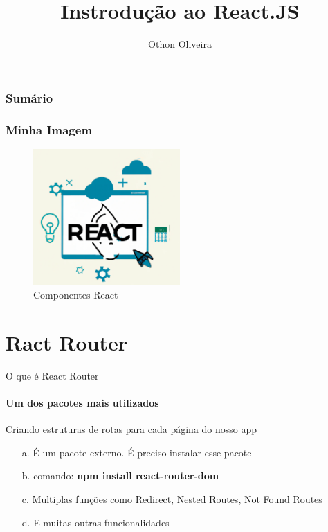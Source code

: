 \documentclass[13pt, xcolor={dvipsnames,svgnames}, portuguese]{beamer}
\author{Othon Oliveira}
\title{Instrodução ao React.JS}
\institute{SENAC - PROA}
\date{}
\begin{document}
\begin{frame}
\titlepage
\end{frame}

\newcommand{\capa}{
    \begin{tikzpicture}[remember picture,overlay]
        \node at (current page.south west)
            {\begin{tikzpicture}[remember picture, overlay]
                \fill[shading=radial,top color=orange,bottom color=orange,middle color=yellow] (0,0) rectangle (\paperwidth,\paperheight);
            \end{tikzpicture}
          };
    \end{tikzpicture}
}

\begin{frame}\frametitle{Sumário}
\tableofcontents
\end{frame}
\begin{frame}
\frametitle{Minha Imagem}
\begin{figure}
\centering
\includegraphics[width=0.5\textwidth]{Figuras/react1.png}
\caption{Componentes React}
\end{figure}
\end{frame}

\section{Ract Router}
\begin{frame}{O que é React Router}
\framesubtitle{Um dos pacotes mais utilizados}
	\begin{block}{Criando estruturas de rotas para cada página do nosso app}
		\begin{itemize}
		  \item[a.] É um pacote externo. É preciso instalar esse pacote
		  \pause
		  \item[b.] comando: \textbf{npm install react-router-dom}
		   \pause		  
		  \item[c.] Multiplas funções como Redirect, Nested Routes, Not Found Routes
		  \pause
		  \item[d.] E muitas outras funcionalidades
		\end{itemize}
	\end{block} 
\end{frame}
\end{document}

